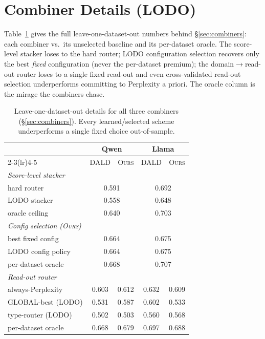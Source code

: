 \documentclass[11pt]{article}
\newcommand{\ours}{\textsc{Ours}}
\newcommand{\dald}{\textsc{DALD}}
\begin{document}
\section{Combiner Details (LODO)}\label{app:combiners}
Table~\ref{tab:app-lodo} gives the full leave-one-dataset-out numbers behind
\S\ref{sec:combiners}: each combiner vs.\ its unselected baseline and its per-dataset oracle.
The score-level stacker loses to the hard router; LODO configuration selection recovers
only the best \emph{fixed} configuration (never the per-dataset premium); the
domain$\to$read-out router loses to a single fixed read-out and even cross-validated
read-out selection underperforms committing to Perplexity a priori. The oracle column is
the mirage the combiners chase.

\begin{table}[t]\centering\small
\setlength{\tabcolsep}{3.5pt}
\begin{tabular}{l cccc}
\toprule
& \multicolumn{2}{c}{Qwen} & \multicolumn{2}{c}{Llama}\\
\cmidrule(lr){2-3}\cmidrule(lr){4-5}
& \dald & \ours & \dald & \ours\\
\midrule
\multicolumn{5}{l}{\emph{Score-level stacker}}\\
hard router          & \multicolumn{2}{c}{0.591} & \multicolumn{2}{c}{0.692}\\
LODO stacker         & \multicolumn{2}{c}{0.558} & \multicolumn{2}{c}{0.648}\\
oracle ceiling       & \multicolumn{2}{c}{0.640} & \multicolumn{2}{c}{0.703}\\
\midrule
\multicolumn{5}{l}{\emph{Config selection (\ours)}}\\
best fixed config    & \multicolumn{2}{c}{0.664} & \multicolumn{2}{c}{0.675}\\
LODO config policy   & \multicolumn{2}{c}{0.664} & \multicolumn{2}{c}{0.675}\\
per-dataset oracle   & \multicolumn{2}{c}{0.668} & \multicolumn{2}{c}{0.707}\\
\midrule
\multicolumn{5}{l}{\emph{Read-out router}}\\
always-Perplexity    & 0.603 & 0.612 & 0.632 & 0.609\\
GLOBAL-best (LODO)   & 0.531 & 0.587 & 0.602 & 0.533\\
type-router (LODO)   & 0.502 & 0.503 & 0.560 & 0.568\\
per-dataset oracle   & 0.668 & 0.679 & 0.697 & 0.688\\
\bottomrule
\end{tabular}
\caption{Leave-one-dataset-out details for all three combiners (\S\ref{sec:combiners}).
Every learned/selected scheme underperforms a single fixed choice out-of-sample.}
\label{tab:app-lodo}
\end{table}
\end{document}
